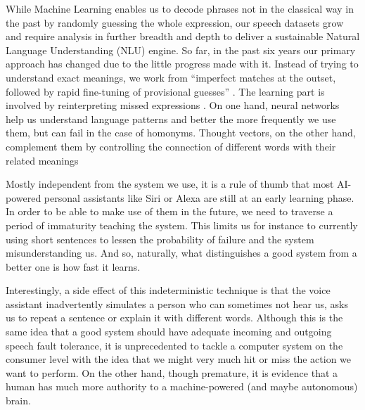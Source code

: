 
While Machine Learning enables us to decode phrases not in the classical way in the past by randomly guessing the whole expression, our speech datasets grow and require analysis in further breadth and depth to deliver a sustainable Natural Language Understanding (NLU) engine.
So far, in the past six years our primary approach has changed due to the little progress made with it. Instead of trying to understand exact meanings, we work from
``imperfect matches at the outset, followed by rapid fine-tuning of provisional guesses'' \cite{mit:Alexa}. The learning part is involved by reinterpreting missed expressions \cite{aws:lex_webinar}. 
On one hand, neural networks help us understand language patterns and better the more frequently we use them, but can fail in the case of homonyms. \cite{mit:AILang} Thought vectors, on the other hand, complement them by controlling the connection of different words with their related meanings %

Mostly independent from the system we use, it is %
a rule of thumb that most AI-powered personal assistants like Siri or Alexa are %
still at an early learning phase. In order to be able to make use of them in the future, %
we need to traverse a period of immaturity teaching the system.
This limits us for instance to currently using short sentences to lessen the probability of failure and the system misunderstanding us. And so, naturally, what distinguishes a good system from a better one is how fast it learns.


Interestingly, a side effect of this indeterministic technique is that the voice assistant inadvertently simulates a person who can sometimes not hear us, asks us to repeat a sentence or explain it with different words. Although this is the same idea that a good system should have adequate incoming and outgoing speech fault tolerance, it is unprecedented to tackle a computer system on the consumer level with the idea that we might very much hit or miss the action we want to perform. On the other hand, though premature, it is evidence that a human has much more authority to a machine-powered (and maybe autonomous) brain.


